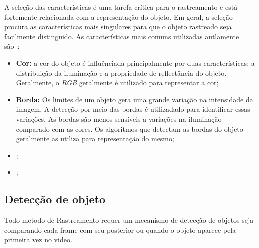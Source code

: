	A seleção das características é uma tarefa crítica para o rastreamento e está fortemente relacionada com a representação do objeto. Em geral, a seleção procura as características mais singulares para que o objeto rastreado seja facilmente distinguido. As características mais comuns utilizadas autlamente são~\cite{yilmaz}:

	\begin{itemize}
		\item \textbf{Cor:} a cor do objeto é influênciada principalmente por duas características: a distribuição da iluminação e a propriedade de reflectância do objeto. Geralmente, o \textit{RGB} geralmente é utilizado para representar a cor;

		\item \textbf{Borda:} Os limites de um objeto gera uma grande variação na intensidade da imagem. A detecção por meio das bordas é utilizadado para identificar essas variações. As bordas são menos sensíveis a variações na iluminação comparado com as cores. Os algoritmos que detectam as bordas do objeto geralmente as utiliza para representação do mesmo;

		\item \textbf{};

		\item \textbf{};

	\end{itemize}





\subsection{Detecção de objeto}

	Todo metodo de Rastreamento requer um mecanismo de detecção de objetos seja comparando cada frame com seu posterior ou quando o objeto aparece pela primeira vez no video.




